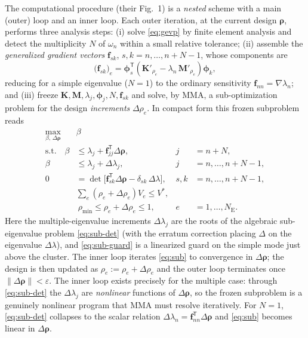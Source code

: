 \documentclass[11pt]{article}
\newcommand{\rhov}{\bm{\rho}}
\newcommand{\Krho}{\mathbf{K}}
\newcommand{\Mrho}{\mathbf{M}}
\newcommand{\phiv}{\bm{\phi}}
\newcommand{\fv}{\mathbf{f}}
\newcommand{\NE}{N_{\mathrm{E}}}
\newcommand{\T}{^{\mathsf{T}}}
\begin{document}
The computational procedure (their Fig.~1) is a \emph{nested} scheme
with a main (outer) loop and an inner loop. Each outer iteration, at the
current design $\rhov$, performs three analysis steps: (i) solve
\eqref{eq:gevp} by finite element analysis and detect the multiplicity
$N$ of $\omega_n$ within a small relative tolerance; (ii) assemble the
\emph{generalized gradient vectors} $\fv_{sk}$, $s,k=n,\dots,n+N-1$,
whose components are
\begin{equation}
\big(\fv_{sk}\big)_e=
\phiv_s\T\!\left(\Krho'_{\rho_e}-\lambda_n\,\Mrho'_{\rho_e}\right)\!\phiv_k,
\label{eq:fsk}
\end{equation}
reducing for a simple eigenvalue ($N=1$) to the ordinary sensitivity
$\fv_{nn}=\nabla\lambda_n$; and (iii) freeze
$\Krho,\Mrho,\lambda_j,\phiv_j,N,\fv_{sk}$ and solve, by MMA, a
sub-optimization problem for the design \emph{increments} $\Delta\rho_e$.
In compact form this frozen subproblem reads
\begin{subequations}
\label{eq:sub}
\begin{align}
\max_{\beta,\,\Delta\rhov}\ & \beta \\
\text{s.t.}\quad
 \beta &\le \lambda_j+\fv_{jj}\T\Delta\rhov, & j&=n+N,
 \label{eq:sub-guard}\\
 \beta &\le \lambda_j+\Delta\lambda_j, & j&=n,\dots,n+N-1,
 \label{eq:sub-mult}\\
 0 &=\det\!\big[\fv_{sk}\T\Delta\rhov-\delta_{sk}\,\Delta\lambda\big],
 & s,k&=n,\dots,n+N-1, \label{eq:sub-det}\\
 &\textstyle\sum_{e}(\rho_e+\Delta\rho_e)V_e \le V^*, \\
 &\ \rho_{\min}\le \rho_e+\Delta\rho_e\le 1, & e&=1,\dots,\NE.
 \label{eq:sub-box}
\end{align}
\end{subequations}
Here the multiple-eigenvalue increments $\Delta\lambda_j$ are the roots of
the algebraic sub-eigenvalue problem \eqref{eq:sub-det} (with the erratum
correction placing $\Delta$ on the eigenvalue $\Delta\lambda$), and
\eqref{eq:sub-guard} is a linearized guard on the simple mode just above
the cluster. The inner loop iterates \eqref{eq:sub} to convergence in
$\Delta\rhov$; the design is then updated as
$\rho_e\!:=\!\rho_e+\Delta\rho_e$ and the outer loop terminates once
$\|\Delta\rhov\|<\varepsilon$. The inner loop exists precisely for the
multiple case: through \eqref{eq:sub-det} the $\Delta\lambda_j$ are
\emph{nonlinear} functions of $\Delta\rhov$, so the frozen subproblem is a
genuinely nonlinear program that MMA must resolve iteratively. For $N=1$,
\eqref{eq:sub-det} collapses to the scalar relation
$\Delta\lambda_n=\fv_{nn}\T\Delta\rhov$ and \eqref{eq:sub} becomes linear
in $\Delta\rhov$.
\end{document}
